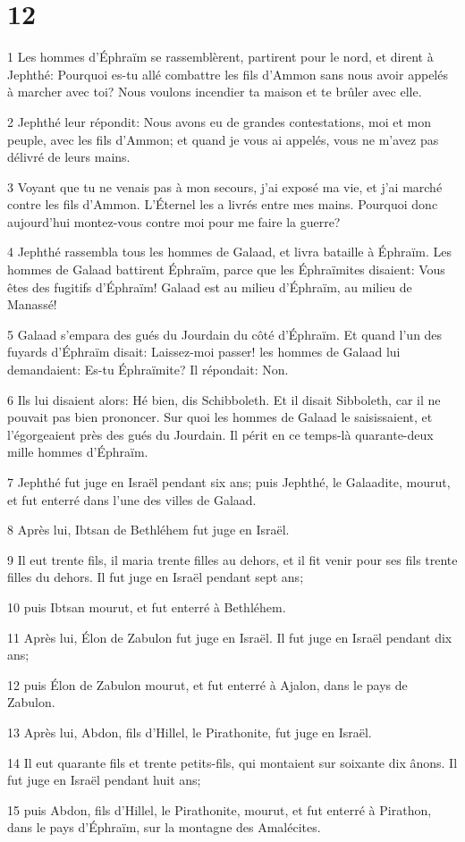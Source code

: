 \chapter{12}

\par 1 Les hommes d'Éphraïm se rassemblèrent, partirent pour le nord, et dirent à Jephthé: Pourquoi es-tu allé combattre les fils d'Ammon sans nous avoir appelés à marcher avec toi? Nous voulons incendier ta maison et te brûler avec elle.
\par 2 Jephthé leur répondit: Nous avons eu de grandes contestations, moi et mon peuple, avec les fils d'Ammon; et quand je vous ai appelés, vous ne m'avez pas délivré de leurs mains.
\par 3 Voyant que tu ne venais pas à mon secours, j'ai exposé ma vie, et j'ai marché contre les fils d'Ammon. L'Éternel les a livrés entre mes mains. Pourquoi donc aujourd'hui montez-vous contre moi pour me faire la guerre?
\par 4 Jephthé rassembla tous les hommes de Galaad, et livra bataille à Éphraïm. Les hommes de Galaad battirent Éphraïm, parce que les Éphraïmites disaient: Vous êtes des fugitifs d'Éphraïm! Galaad est au milieu d'Éphraïm, au milieu de Manassé!
\par 5 Galaad s'empara des gués du Jourdain du côté d'Éphraïm. Et quand l'un des fuyards d'Éphraïm disait: Laissez-moi passer! les hommes de Galaad lui demandaient: Es-tu Éphraïmite? Il répondait: Non.
\par 6 Ils lui disaient alors: Hé bien, dis Schibboleth. Et il disait Sibboleth, car il ne pouvait pas bien prononcer. Sur quoi les hommes de Galaad le saisissaient, et l'égorgeaient près des gués du Jourdain. Il périt en ce temps-là quarante-deux mille hommes d'Éphraïm.
\par 7 Jephthé fut juge en Israël pendant six ans; puis Jephthé, le Galaadite, mourut, et fut enterré dans l'une des villes de Galaad.
\par 8 Après lui, Ibtsan de Bethléhem fut juge en Israël.
\par 9 Il eut trente fils, il maria trente filles au dehors, et il fit venir pour ses fils trente filles du dehors. Il fut juge en Israël pendant sept ans;
\par 10 puis Ibtsan mourut, et fut enterré à Bethléhem.
\par 11 Après lui, Élon de Zabulon fut juge en Israël. Il fut juge en Israël pendant dix ans;
\par 12 puis Élon de Zabulon mourut, et fut enterré à Ajalon, dans le pays de Zabulon.
\par 13 Après lui, Abdon, fils d'Hillel, le Pirathonite, fut juge en Israël.
\par 14 Il eut quarante fils et trente petits-fils, qui montaient sur soixante dix ânons. Il fut juge en Israël pendant huit ans;
\par 15 puis Abdon, fils d'Hillel, le Pirathonite, mourut, et fut enterré à Pirathon, dans le pays d'Éphraïm, sur la montagne des Amalécites.

